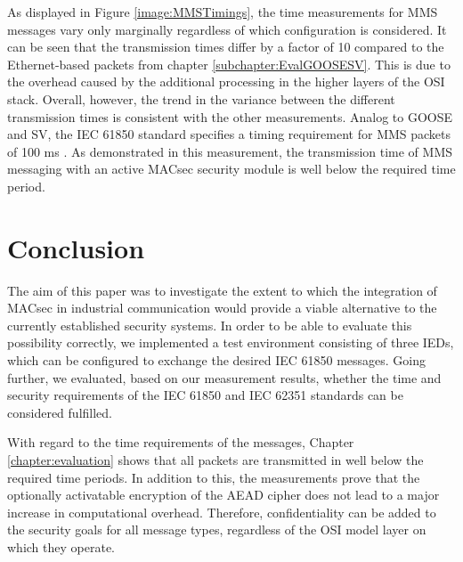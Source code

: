 \documentclass[conference, onecolumn, a4paper]{IEEEtran}
\begin{document}
\noindent As displayed in Figure \ref{image:MMSTimings}, the time measurements for MMS messages vary only marginally regardless of which configuration 
is considered. It can be seen that the transmission times differ by a factor of 10 compared to the Ethernet-based packets from chapter \ref{subchapter:EvalGOOSESV}.
This is due to the overhead caused by the additional processing in the higher layers of the OSI stack. Overall, however, the trend in the variance between 
the different transmission times is consistent with the other measurements. Analog to GOOSE and SV, the IEC 61850 standard specifies a timing requirement 
for MMS packets of 100 ms \cite{fixedLatencyGOOSESV:2021}. As demonstrated in this measurement, the transmission time of MMS messaging with an active 
MACsec security module is well below the required time period. 

\section{Conclusion}
\label{chapter:conclusion}
\noindent The aim of this paper was to investigate the extent to which the integration of MACsec in industrial communication would provide a viable 
alternative to the currently established security systems. In order to be able to evaluate this possibility correctly, we implemented a test environment  
consisting of three IEDs, which can be configured to exchange the desired IEC 61850 messages. Going further, we evaluated, based on 
our measurement results, whether the time and security requirements of the IEC 61850 and IEC 62351 standards can be considered fulfilled.  

\smallskip
With regard to the time requirements of the messages, Chapter \ref{chapter:evaluation} shows that all packets are transmitted in well below the required 
time periods. In addition to this, the measurements prove that the optionally activatable encryption of the AEAD cipher does not lead to a major increase 
in computational overhead. Therefore, confidentiality can be added to the security goals for all message types, regardless of the OSI model layer on which they 
operate. 
\end{document}
